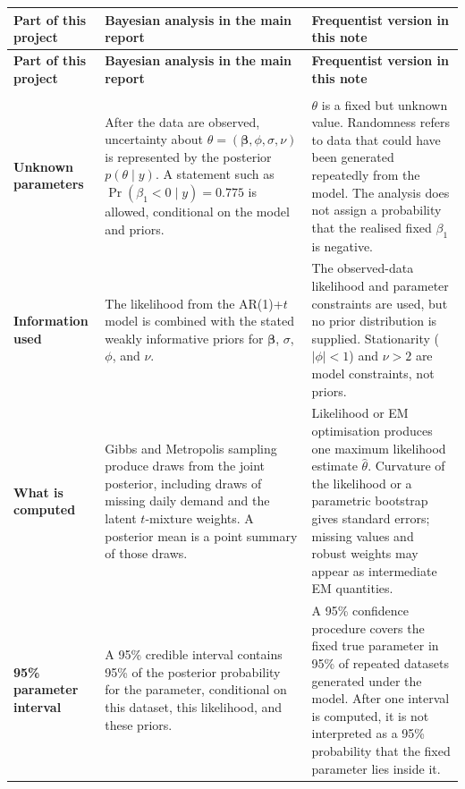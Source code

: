 \documentclass[11pt]{article}
\begin{document}
\begingroup
\footnotesize
\setlength{\tabcolsep}{4pt}
\renewcommand{\arraystretch}{1.17}
\begin{longtable}{@{}>{\raggedright\arraybackslash}p{}
                        >{\raggedright\arraybackslash}p{}
                        >{\raggedright\arraybackslash}p{}@{}}
\toprule
\textbf{Part of this project} &
\textbf{Bayesian analysis in the main report} &
\textbf{Frequentist version in this note} \\
\midrule
\endfirsthead
\toprule
\textbf{Part of this project} &
\textbf{Bayesian analysis in the main report} &
\textbf{Frequentist version in this note} \\
\midrule
\endhead
\midrule
\multicolumn{3}{r}{\textit{Continued on the next page}} \\
\endfoot
\bottomrule
\endlastfoot

\textbf{Unknown parameters} &
After the data are observed, uncertainty about
$\theta=(\boldsymbol\beta,\phi,\sigma,\nu)$ is represented by the posterior
$p(\theta\mid y)$. A statement such as
$\Pr(\beta_1<0\mid y)=0.775$ is allowed, conditional on the model and priors. &
$\theta$ is a fixed but unknown value. Randomness refers to data that could
have been generated repeatedly from the model. The analysis does not assign a
probability that the realised fixed $\beta_1$ is negative. \\

\textbf{Information used} &
The likelihood from the AR(1)+$t$ model is combined with the stated weakly
informative priors for $\boldsymbol\beta$, $\sigma$, $\phi$, and $\nu$. &
The observed-data likelihood and parameter constraints are used, but no prior
distribution is supplied. Stationarity ($|\phi|<1$) and $\nu>2$ are model
constraints, not priors. \\

\textbf{What is computed} &
Gibbs and Metropolis sampling produce draws from the joint posterior, including
draws of missing daily demand and the latent $t$-mixture weights. A posterior
mean is a point summary of those draws. &
Likelihood or EM optimisation produces one maximum likelihood estimate
$\hat\theta$. Curvature of the likelihood or a parametric bootstrap gives
standard errors; missing values and robust weights may appear as intermediate
EM quantities. \\

\textbf{95\% parameter interval} &
A 95\% credible interval contains 95\% of the posterior probability for the
parameter, conditional on this dataset, this likelihood, and these priors. &
A 95\% confidence procedure covers the fixed true parameter in 95\% of
repeated datasets generated under the model. After one interval is computed,
it is not interpreted as a 95\% probability that the fixed parameter lies
inside it. \\


\end{longtable}
\end{document}
